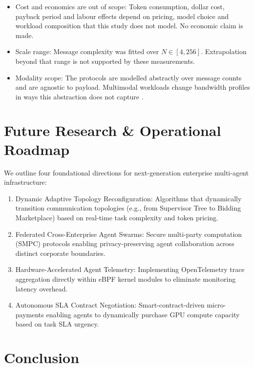 \documentclass{article}
\begin{document}
\begin{itemize}
  \item Cost and economics are out of scope: Token consumption, dollar cost, payback period and labour effects depend on pricing, model choice and workload composition that this study does not model. No economic claim is made.
  \item Scale range: Message complexity was fitted over $N \in [4, 256]$. Extrapolation beyond that range is not supported by these measurements.
  \item Modality scope: The protocols are modelled abstractly over message counts and are agnostic to payload. Multimodal workloads change bandwidth profiles in ways this abstraction does not capture \cite{arxiv_2308_12898,plos_10_1371_journal_pone_0340964}.
\end{itemize}




\section{Future Research \& Operational Roadmap}


We outline four foundational directions for next-generation enterprise multi-agent infrastructure:
\begin{enumerate}
  \item Dynamic Adaptive Topology Reconfiguration: Algorithms that dynamically transition communication topologies (e.g., from Supervisor Tree to Bidding Marketplace) based on real-time task complexity and token pricing.
  \item Federated Cross-Enterprise Agent Swarms: Secure multi-party computation (SMPC) protocols enabling privacy-preserving agent collaboration across distinct corporate boundaries.
  \item Hardware-Accelerated Agent Telemetry: Implementing OpenTelemetry trace aggregation directly within eBPF kernel modules to eliminate monitoring latency overhead.
  \item Autonomous SLA Contract Negotiation: Smart-contract-driven micro-payments enabling agents to dynamically purchase GPU compute capacity based on task SLA urgency.
\end{enumerate}




\section{Conclusion}
\end{document}

